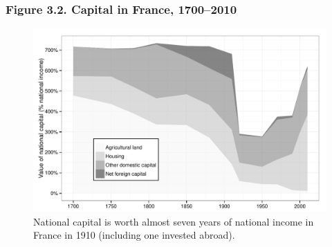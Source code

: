 \documentclass[t]{beamer}\usepackage[]{graphicx}\usepackage[]{color}
\newenvironment{knitrout}{}{} %
\begin{document}
\begin{frame}[label=Figure_3_2]
\frametitle{Figure 3.2. Capital in France, 1700--2010}
\begin{figure}[t]
\begin{minipage}[b]{\textwidth}
\centering
\begin{knitrout}\footnotesize
{}\color{fgcolor}

{\centering \includegraphics[width=1\linewidth]{figures/bw/Figure_3_2} 

}



\end{knitrout}
\caption{National capital is worth almost seven years of national income in France in 1910 (including one invested abroad).}
\end{minipage}
\end{figure}
\end{frame}
\end{document}
